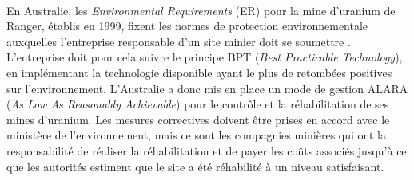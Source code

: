 \documentclass{article}
\begin{document}
\paragraph{} En Australie, les \textit{Environmental Requirements} (ER) pour la mine d’uranium de Ranger, établis en 1999, fixent les normes de protection environnementale auxquelles l’entreprise responsable d’un site minier doit se soumettre \cite{noauthor_department_nodate}.
L’entreprise doit pour cela suivre le principe BPT (\textit{Best Practicable Technology}), en implémentant la technologie disponible ayant le plus de retombées positives sur l’environnement. L’Australie a donc mis en place un mode de gestion ALARA (\textit{As Low As Reasonably Achievable}) pour le contrôle et la réhabilitation de ses mines d’uranium. Les mesures correctives doivent être prises en accord avec le ministère de l’environnement, mais ce sont les compagnies minières qui ont la responsabilité de réaliser la réhabilitation et de payer les coûts associés jusqu’à ce que les autorités estiment que le site a été réhabilité à un niveau satisfaisant.

\end{document}
